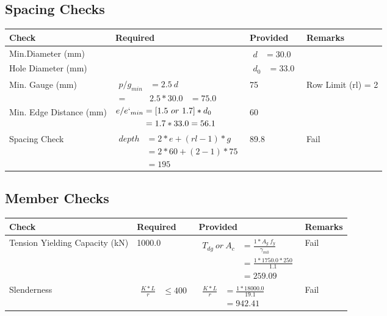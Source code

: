 \documentclass{article}%
\begin{document}
\subsection{Spacing Checks}%
\label{subsec:SpacingChecks}%
\renewcommand{\arraystretch}{1.2}%
\begin{longtable}{|p{2.5cm}|p{7.5cm}|p{3cm}|p{3cm}|}%
\hline%
\rowcolor{OsdagGreen}%
Check&Required&Provided&Remarks\\%
\hline%
\endhead%
\hline%
Min.Diameter (mm)&&$\begin{aligned} d &=30.0\end{aligned}$&\\%
\hline%
Hole Diameter (mm)& &$\begin{aligned} d_0 &=33.0\end{aligned}$&\\%
\hline%
Min. Gauge (mm)&$\begin{aligned}p/g_{min}&= 2.5 ~ d&\\ =&2.5*30.0&=75.0\end{aligned}$&75&Row Limit (rl) = 2\\%
\hline%
Min. Edge Distance (mm)&$\begin{aligned}e/e`_{min} &=[1.5~or~ 1.7] * d_0\\ &=1.7*33.0=56.1 \end{aligned}$&60&\\%
\hline%
Spacing Check&$\begin{aligned} depth & = 2 * e + (rl -1) * g \\ & = 2 * 60+(2-1)*75 \\ & = 195\end{aligned}$&89.8&Fail\\%
\hline%
\end{longtable}

%
\newpage%
\subsection{Member Checks}%
\label{subsec:MemberChecks}%
\renewcommand{\arraystretch}{1.2}%
\begin{longtable}{|p{2.5cm}|p{4.5cm}|p{8cm}|p{1cm}|}%
\hline%
\rowcolor{OsdagGreen}%
Check&Required&Provided&Remarks\\%
\hline%
\endhead%
\hline%
Tension Yielding Capacity (kN)&1000.0&$\begin{aligned}T_{dg}~or~A_c&= \frac{1 * A_g ~ f_y}{\gamma_{m0}}\\ &= \frac{1*1750.0*250}{1.1}\\ &= 259.09\end{aligned}$&Fail\\%
\hline%
Slenderness&$\begin{aligned}\frac{K * L}{r} &\leq 400\end{aligned}$&$\begin{aligned}\frac{K * L}{r} &= \frac{1*18000.0}{19.1}\\ &= 942.41\end{aligned}$&Fail\\%
\hline%
\end{longtable}

%
%
\newpage%
\end{document}
